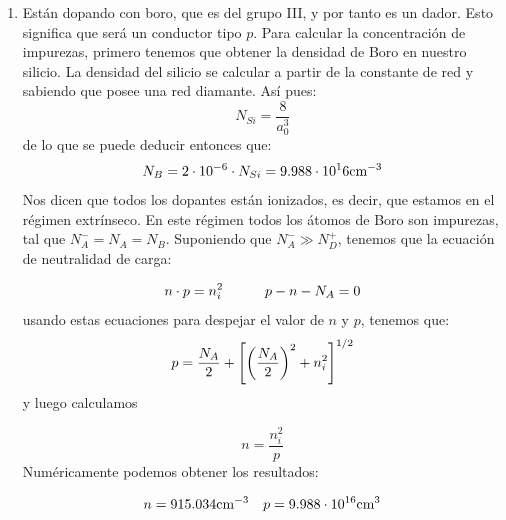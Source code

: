 \begin{texercise}
\begin{enumerate}[label=\alph*)]
		\item Están dopando con boro, que es del grupo III, y por tanto es un dador. Esto significa que será un conductor tipo $p$. Para calcular la concentración de impurezas, primero tenemos que obtener la densidad de Boro en nuestro silicio. La densidad del silicio se calcular a partir de la constante de red y sabiendo que posee una red diamante. Así pues:
		      \begin{equation}
			      N_{Si} = \frac{8}{a_0^3}
		      \end{equation}
		      de lo que se puede deducir entonces que:
		      \begin{equation}
			      N_B = 2\cdot 10^{-6} \cdot N_{Si} = 9.988 \cdot 10^16 \text{cm}^{-3}
		      \end{equation}
		      Nos dicen que todos los dopantes están ionizados, es decir, que estamos en el régimen extrínseco. En este régimen todos los átomos de Boro son impurezas, tal que $N_A^-=N_A=N_B$. Suponiendo que $N_A^- \gg N_D^+$, tenemos que la ecuación de neutralidad de carga:

		      \begin{equation}
			      n\cdot p = n_i^2 \quad \quad \quad p-n-N_A = 0
		      \end{equation}
		      usando estas ecuaciones para despejar el valor de $n$ y $p$, tenemos que:
		      \begin{equation}
			      p = \frac{N_A}{2} + \left[ \left( \frac{N_A}{2} \right)^2 + n_i^2 \right]^{1/2}
		      \end{equation}
		      y luego calculamos

		      \begin{equation}
			      n = \frac{n_i^2}{p}
		      \end{equation}
		      Numéricamente podemos obtener los resultados:

		      \begin{equation}
			      n=915.034 \text{cm}^{-3} \quad p = 9.988 \cdot 10^{16} \text{cm}^3
		      \end{equation}



\end{enumerate}
\end{texercise}

